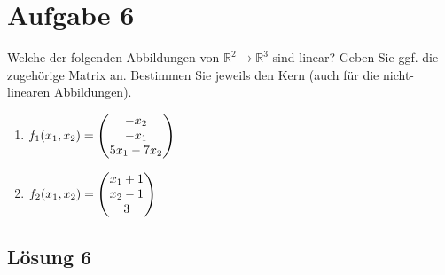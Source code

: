 \documentclass[main.tex]{subfiles}
\begin{document}
\section{Aufgabe 6}
Welche der folgenden Abbildungen von $\mathbb{R}^2 \to \mathbb{R}^3$ sind linear? Geben Sie ggf. die zugehörige Matrix an.
Bestimmen Sie jeweils den Kern (auch für die nicht-linearen Abbildungen).

\begin{enumerate}
    \item $f_1(x_1, x_2) = \vektor{ -x_2 \\ -x_1 \\ 5x_1 - 7x_2 }$
    \item $f_2(x_1, x_2) = \vektor{ x_1 + 1 \\ x_2 - 1 \\ 3 }$
\end{enumerate}

\subsection{Lösung 6}
\end{document}
